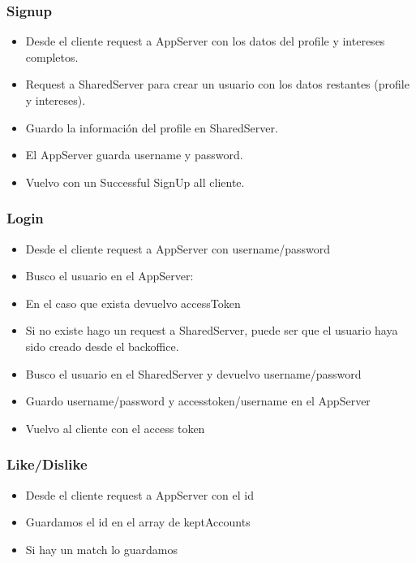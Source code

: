 \documentclass[letterpaper,10pt,english]{sphinxmanual}
\begin{document}
\subsubsection{Signup}
\label{manuals:signup}\begin{itemize}
\item {} 
Desde el cliente request a AppServer con los datos del profile y intereses completos.

\item {} 
Request a SharedServer para crear un usuario con los datos restantes (profile y intereses).

\item {} 
Guardo la información del profile en SharedServer.

\item {} 
El AppServer guarda username y password.

\item {} 
Vuelvo con un Successful SignUp all cliente.

\end{itemize}


\subsubsection{Login}
\label{manuals:login}\begin{itemize}
\item {} 
Desde el cliente request a AppServer con username/password

\item {} 
Busco el usuario en el AppServer:

\item {} 
En el caso que exista devuelvo accessToken

\item {} 
Si no existe hago un request a SharedServer, puede ser que el usuario haya sido creado desde el backoffice.

\item {} 
Busco el usuario en el SharedServer y devuelvo username/password

\item {} 
Guardo username/password y accesstoken/username en el AppServer

\item {} 
Vuelvo al cliente con el access token

\end{itemize}


\subsubsection{Like/Dislike}
\label{manuals:like-dislike}\begin{itemize}
\item {} 
Desde el cliente request a AppServer con el id

\item {} 
Guardamos el id en el array de keptAccounts

\item {} 
Si hay un match lo guardamos

\end{itemize}
\end{document}
